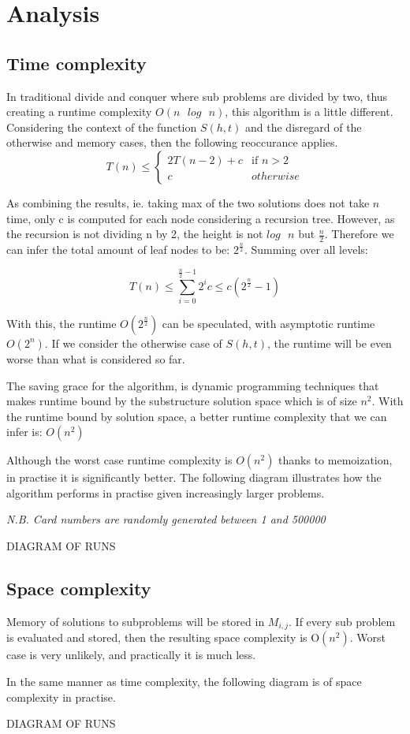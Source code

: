 \section{Analysis}

\subsection{Time complexity}
In traditional divide and conquer where sub problems are divided by two, thus creating a runtime complexity $O(n\text{ } log\text{ } n)$, this algorithm is a little different.
Considering the context of the function $S(h,t)$ and the disregard of the otherwise and memory cases, then the following reoccurance applies.
$$ T(n) \leq \begin{cases}
    2T(n-2) + c & \text{if } n > 2 \\
    c & otherwise
\end{cases} $$ 

As combining the results, ie. taking max of the two solutions does not take $n$ time, only c is computed for each node considering a recursion tree. 
However, as the recursion is not dividing n by 2, the height is not $log \text{ } n$ but $\frac{n}{2}$.
Therefore we can infer the total amount of leaf nodes to be: $2^{\frac{n}{2}}$. Summing over all levels:

$$ T(n) \leq \sum_{i=0}^{\frac{n}{2}-1} 2^{i}c \leq c (2^{\frac{n}{2}} - 1) $$

With this, the runtime $O(2^{\frac{n}{2}})$ can be speculated, with asymptotic runtime $O(2^{n})$.
If we consider the otherwise case of $S(h,t)$, the runtime will be even worse than what is considered so far. 

The saving grace for the algorithm, is dynamic programming techniques that makes runtime bound by the substructure solution space which is of size $n^2$.
With the runtime bound by solution space, a better runtime complexity that we can infer is: $O(n^2)$ 

Although the worst case runtime complexity is $O(n^2)$ thanks to memoization, in practise it is significantly better.
The following diagram illustrates how the algorithm performs in practise given increasingly larger problems.

\textit{N.B. Card numbers are randomly generated between 1 and 500000}

DIAGRAM OF RUNS


\subsection{Space complexity}

Memory of solutions to subproblems will be stored in $M_{i,j}$.
If every sub problem is evaluated and stored, then the resulting space complexity is O$(n^2)$.
Worst case is very unlikely, and practically it is much less.

In the same manner as time complexity, the following diagram is of space complexity in practise.

DIAGRAM OF RUNS